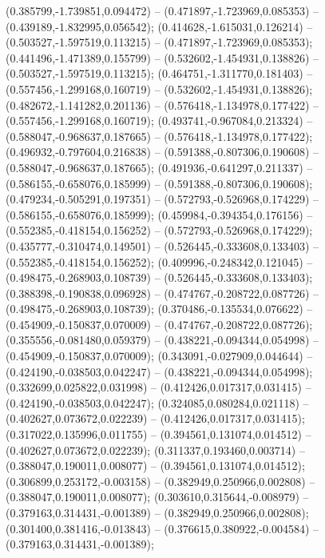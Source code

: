  (0.385799,-1.739851,0.094472) -- (0.471897,-1.723969,0.085353) -- (0.439189,-1.832995,0.056542);
 (0.414628,-1.615031,0.126214) -- (0.503527,-1.597519,0.113215) -- (0.471897,-1.723969,0.085353);
 (0.441496,-1.471389,0.155799) -- (0.532602,-1.454931,0.138826) -- (0.503527,-1.597519,0.113215);
 (0.464751,-1.311770,0.181403) -- (0.557456,-1.299168,0.160719) -- (0.532602,-1.454931,0.138826);
 (0.482672,-1.141282,0.201136) -- (0.576418,-1.134978,0.177422) -- (0.557456,-1.299168,0.160719);
 (0.493741,-0.967084,0.213324) -- (0.588047,-0.968637,0.187665) -- (0.576418,-1.134978,0.177422);
 (0.496932,-0.797604,0.216838) -- (0.591388,-0.807306,0.190608) -- (0.588047,-0.968637,0.187665);
 (0.491936,-0.641297,0.211337) -- (0.586155,-0.658076,0.185999) -- (0.591388,-0.807306,0.190608);
 (0.479234,-0.505291,0.197351) -- (0.572793,-0.526968,0.174229) -- (0.586155,-0.658076,0.185999);
 (0.459984,-0.394354,0.176156) -- (0.552385,-0.418154,0.156252) -- (0.572793,-0.526968,0.174229);
 (0.435777,-0.310474,0.149501) -- (0.526445,-0.333608,0.133403) -- (0.552385,-0.418154,0.156252);
 (0.409996,-0.248342,0.121045) -- (0.498475,-0.268903,0.108739) -- (0.526445,-0.333608,0.133403);
 (0.388398,-0.190838,0.096928) -- (0.474767,-0.208722,0.087726) -- (0.498475,-0.268903,0.108739);
 (0.370486,-0.135534,0.076622) -- (0.454909,-0.150837,0.070009) -- (0.474767,-0.208722,0.087726);
 (0.355556,-0.081480,0.059379) -- (0.438221,-0.094344,0.054998) -- (0.454909,-0.150837,0.070009);
 (0.343091,-0.027909,0.044644) -- (0.424190,-0.038503,0.042247) -- (0.438221,-0.094344,0.054998);
 (0.332699,0.025822,0.031998) -- (0.412426,0.017317,0.031415) -- (0.424190,-0.038503,0.042247);
 (0.324085,0.080284,0.021118) -- (0.402627,0.073672,0.022239) -- (0.412426,0.017317,0.031415);
 (0.317022,0.135996,0.011755) -- (0.394561,0.131074,0.014512) -- (0.402627,0.073672,0.022239);
 (0.311337,0.193460,0.003714) -- (0.388047,0.190011,0.008077) -- (0.394561,0.131074,0.014512);
 (0.306899,0.253172,-0.003158) -- (0.382949,0.250966,0.002808) -- (0.388047,0.190011,0.008077);
 (0.303610,0.315644,-0.008979) -- (0.379163,0.314431,-0.001389) -- (0.382949,0.250966,0.002808);
 (0.301400,0.381416,-0.013843) -- (0.376615,0.380922,-0.004584) -- (0.379163,0.314431,-0.001389);
